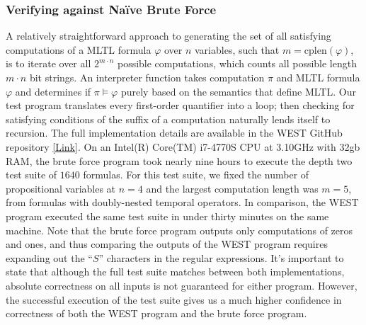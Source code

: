 \documentclass[runningheads]{llncs}
\renewcommand{\phi}{\varphi}
\begin{document}
\subsubsection{Verifying against Na\"ive Brute Force}
A relatively straightforward approach to generating the set of all satisfying computations of a MLTL formula $\phi$ over $n$ variables, such that $m = \text{cplen}(\phi)$, is to iterate over all $2^{m \cdot n}$ possible computations, which counts all possible length $m \cdot n$ bit strings. 
An interpreter function takes computation $\pi$ and MLTL formula $\phi$ and determines if $\pi \vDash \phi$ purely based on the semantics that define MLTL.
Our test program translates every first-order quantifier into a loop; then checking for satisfying conditions of the suffix of a computation naturally lends itself to recursion.
The full implementation details are available in the WEST GitHub repository \href{https://github.com/zwang271/2022-Iowa-State-REU-Temporal-Logic-}{[Link]}.
On an Intel(R) Core(TM) i7-4770S CPU at 3.10GHz with 32gb RAM, the brute force program took nearly nine hours to execute the depth two test suite of $1640$ formulas. 
For this test suite, we fixed the number of propositional variables at $n = 4$ and the largest computation length was $m = 5$, from formulas with doubly-nested temporal operators. 
In comparison, the WEST program executed the same test suite in under thirty minutes on the same machine. Note that the brute force program outputs only computations of zeros and ones, and thus comparing the outputs of the WEST program requires expanding out the ``$S$'' characters in the regular expressions. %
It's important to state that although the full test suite matches between both implementations, absolute correctness on all inputs is not guaranteed for either program. However, the successful execution of the test suite gives us a much higher confidence in correctness of both the WEST program and the brute force program. 
\end{document}
